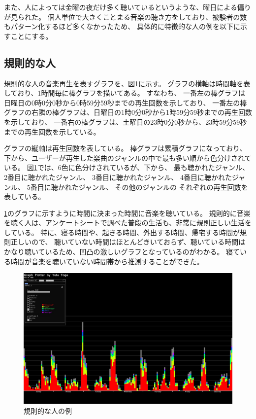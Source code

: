 \documentclass[11pt, onecolumn]{jsarticle}
\begin{document}
また、人によっては金曜の夜だけ多く聴いているというような、曜日による偏りが見られた。
個人単位で大きくことまる音楽の聴き方をしており、被験者の数もパターン化するほど多くなかったため、
具体的に特徴的な人の例を以下に示すことにする。

\subsection{規則的な人}
規則的な人の音楽再生を表すグラフを、図\ref{sample_regular}に示す。
グラフの横軸は時間軸を表しており、1時間毎に棒グラフを描いてある。
すなわち、
一番左の棒グラフは日曜日の0時0分0秒から0時59分59秒までの再生回数を示しており、
一番左の棒グラフの右隣の棒グラフは、日曜日の1時0分0秒から1時59分59秒までの再生回数を示しており、
一番右の棒グラフは、土曜日の23時0分0秒から、23時59分59秒までの再生回数を示している。

グラフの縦軸は再生回数を表している。
棒グラフは累積グラフになっており、下から、ユーザーが再生した楽曲のジャンルの中で最も多い順から色分けされている。
図\ref{sample_regular}では、6色に色分けされているが、下から、
最も聴かれたジャンル、
2番目に聴かれたジャンル、
3番目に聴かれたジャンル、
4番目に聴かれたジャンル、
5番目に聴かれたジャンル、
その他のジャンルの
それぞれの再生回数を表している。

\ref{sample_regular}のグラフに示すように時間に決まった時間に音楽を聴いている。
規則的に音楽を聴く人は、アンケートシートで調べた普段の生活も、非常に規則正しい生活をしている。
特に、寝る時間や、起きる時間、外出する時間、帰宅する時間が規則正しいので、
聴いていない時間はほとんどきいておらず、聴いている時間はかなり聴いているため、凹凸の激しいグラフとなっているのがわかる。
寝ている時間が音楽を聴いていない時間帯から推測することができた。

\begin{figure}[h]
\begin{center}
\includegraphics[width=14cm]{sample_regular.jpg}
\caption{規則的な人の例}
\label{sample_regular}
\end{center}
\end{figure}
\end{document}
